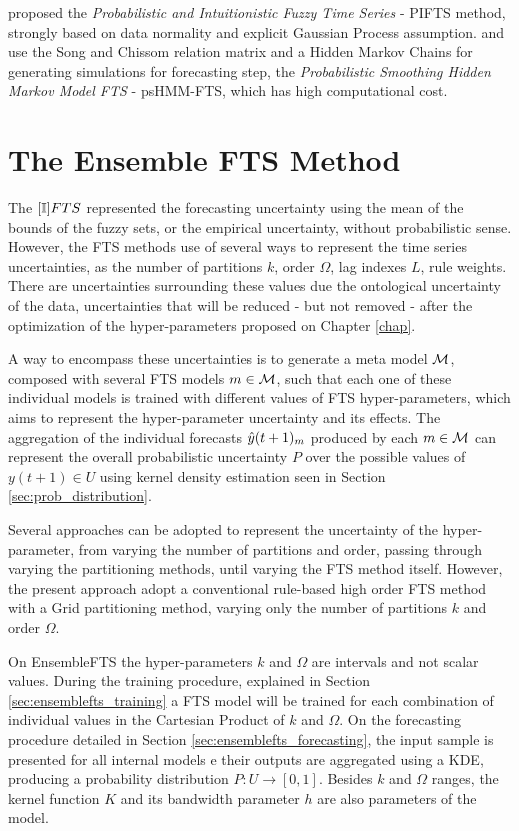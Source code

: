  \cite{Gangwar2014} proposed the \textit{Probabilistic and Intuitionistic Fuzzy Time Series} - PIFTS method, strongly based on data normality and explicit Gaussian Process assumption. \cite{Cheng2012} and \cite{Chuang2014} use the Song and Chissom relation matrix and a Hidden Markov Chains for generating simulations for forecasting step, the \textit{Probabilistic Smoothing Hidden Markov Model FTS} - psHMM-FTS, which has high computational cost.

%
\section{The Ensemble FTS Method}
\label{sec:ensemblefts}

The $[\mathbb{I}]FTS$ represented the forecasting uncertainty using the mean of the bounds of the fuzzy sets, or the empirical uncertainty, without probabilistic sense. However, the FTS methods use of several ways to represent the time series uncertainties, as the number of partitions $k$, order $\Omega$, lag indexes $L$, rule weights. There are uncertainties surrounding these values due the ontological uncertainty of the data, uncertainties that will be reduced - but not removed - after the optimization of the hyper-parameters proposed on Chapter \ref{chap}.

A way to encompass these uncertainties is to generate a meta model $\mathcal{M}$, composed with several FTS models $m \in \mathcal{M}$, such that each one of these individual models is trained with different values of FTS hyper-parameters, which aims to represent the hyper-parameter uncertainty and its effects. The aggregation of the individual forecasts $\hat{y}(t+1)_m$ produced by each $m \in \mathcal{M}$ can represent the overall probabilistic uncertainty $P$ over the possible values of $y(t+1) \in U$ using kernel density estimation seen in Section \ref{sec:prob_distribution}.

Several approaches can be adopted to represent the uncertainty of the hyper-parameter, from varying the number of partitions and order, passing through varying the partitioning methods, until varying the FTS method itself. However, the present approach adopt a conventional rule-based high order FTS method with a Grid partitioning method, varying only the number of partitions $k$ and order $\Omega$.

On EnsembleFTS the hyper-parameters $k$ and $\Omega$ are intervals and not scalar values. During the training procedure, explained in Section \ref{sec:ensemblefts_training} a FTS model will be trained for each combination of individual values in the Cartesian Product of $k$ and $\Omega$. On the forecasting procedure detailed in Section \ref{sec:ensemblefts_forecasting}, the input sample is presented for all internal models e their outputs are aggregated using a KDE, producing a probability distribution $P:U \rightarrow [0,1]$. Besides $k$ and $\Omega$ ranges, the kernel function $K$ and its bandwidth parameter $h$ are also parameters of the model.


